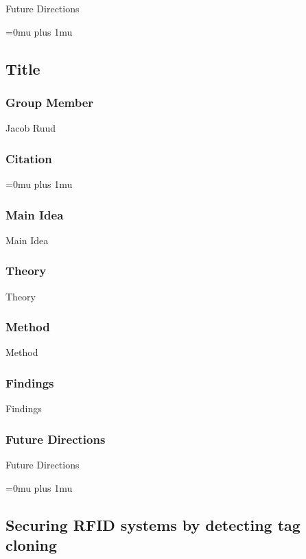 \noindent
Future Directions 

\Urlmuskip=0mu plus 1mu\relax

\noindent
\subsection{Title}

\subsubsection{Group Member}

\noindent
Jacob Ruud

\noindent
\subsubsection{Citation}

\Urlmuskip=0mu plus 1mu\relax

\subsubsection{Main Idea}

\noindent
Main Idea

\subsubsection{Theory}

\noindent
Theory

\subsubsection{Method}

\noindent
Method

\subsubsection{Findings}

\noindent
Findings

\subsubsection{Future Directions}

\noindent
Future Directions 

\Urlmuskip=0mu plus 1mu\relax

\noindent
\subsection{Securing RFID systems by detecting tag cloning}

